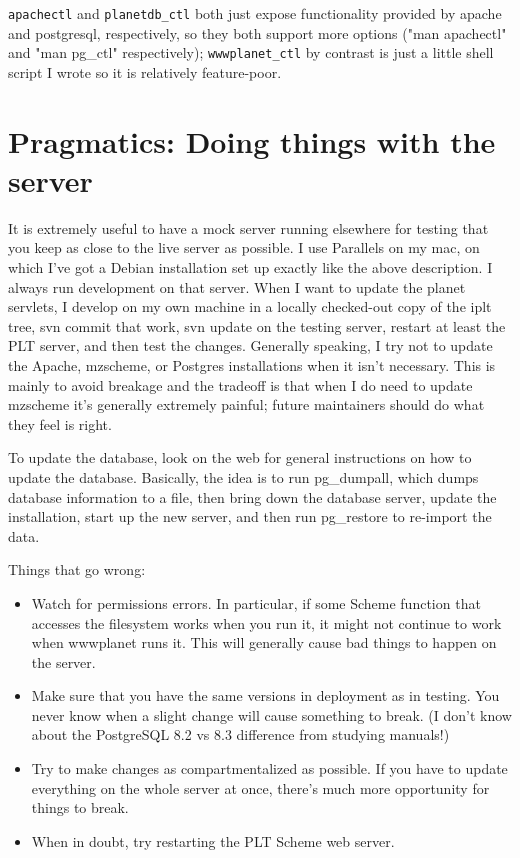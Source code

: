 \documentclass{article}
\begin{document}
\texttt{apachectl} and \texttt{planetdb\_ctl} both just expose
functionality provided by apache and postgresql, respectively, so they
both support more options ("man apachectl" and "man pg\_ctl"
respectively); \texttt{wwwplanet\_ctl} by contrast is just a little shell script
I wrote so it is relatively feature-poor.

\section{Pragmatics: Doing things with the server}

It is extremely useful to have a mock server running elsewhere for
testing that you keep as close to the live server as possible. I use
Parallels on my mac, on which I've got a Debian installation set up
exactly like the above description. I always run development on that
server. When I want to update the planet servlets, I develop on my own
machine in a locally checked-out copy of the iplt tree, svn commit
that work, svn update on the testing server, restart at least the PLT
server, and then test the changes. Generally speaking, I try not to
update the Apache, mzscheme, or Postgres installations when it isn't
necessary. This is mainly to avoid breakage and the tradeoff is that
when I do need to update mzscheme it's generally extremely painful;
future maintainers should do what they feel is right.

To update the database, look on the web for general instructions on
how to update the database. Basically, the idea is to run pg\_dumpall,
which dumps database information to a file, then bring down the
database server, update the installation, start up the new server, and
then run pg\_restore to re-import the data.

Things that go wrong:

\begin{itemize}
\item Watch for permissions errors. In particular, if some Scheme function
  that accesses the filesystem works when you run it, it might not
  continue to work when wwwplanet runs it. This will generally cause
  bad things to happen on the server.

\item Make sure that you have the same versions in deployment as in
  testing. You never know when a slight change will cause something to
  break. (I don't know about the PostgreSQL 8.2 vs 8.3 difference from
  studying manuals!)

\item Try to make changes as compartmentalized as possible. If you have to
  update everything on the whole server at once, there's much more
  opportunity for things to break.

\item When in doubt, try restarting the PLT Scheme web server.
\end{itemize}
\end{document}
